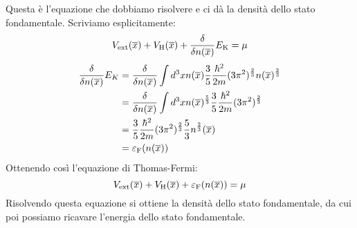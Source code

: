 Questa è l'equazione che dobbiamo risolvere e ci dà la densità dello stato fondamentale. Scriviamo esplicitamente:
\begin{equation*}
    V_{\text {ext}}(\overline x)+V_{\text H}(\overline x) + \functionalderivative{n(\overline x)}E_{\text K}=\mu
\end{equation*}
\begin{equation*}
    \begin{aligned}
        \functionalderivative{n(\overline x)}E_{K}
        & =\functionalderivative{n(\overline x)}\int d^3x n(\overline x)\frac 35 \frac{\hbar^2}{2m}(3\pi^2)^{\frac 23}n(\overline x)^{\frac 23} \\
        & = \functionalderivative{n(\overline x)}\int d^3x n(\overline x)^{\frac 53}\frac 35 \frac{\hbar^2}{2m}(3\pi^2)^{\frac 23} \\
        & = \frac 35\frac{\hbar^2}{2m}(3\pi^2)^{\frac 23}\frac 53n^{\frac 23}(\overline x)\\
        & = \varepsilon_{\text F}(n(\overline x))
    \end{aligned}
\end{equation*}
Ottenendo così l'equazione di Thomas-Fermi:
\begin{equation*}
    V_{\text {ext}}(\overline x)+V_{\text H}(\overline x) + \varepsilon_{\text F}(n(\overline x))=\mu
\end{equation*}
Risolvendo questa equazione si ottiene la densità dello stato fondamentale, da cui poi possiamo ricavare l'energia dello stato fondamentale.